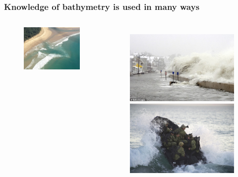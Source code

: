 \documentclass[7pt]{beamer}
\begin{document}
\begin{frame}
    \frametitle{Knowledge of bathymetry is used in many ways}
        \begin{columns}
                \begin{figure}[h!]
                		\includegraphics[width=1\linewidth]{img/Rip_C.jpg}\hfill
                \end{figure}              
                \begin{figure}
                		\includegraphics[width=1\linewidth]{img/C_Flood.jpg}\vfill
               		\includegraphics[width=1\linewidth]{img/Navy_S.jpg}

\end{figure}
\end{columns}
\end{frame}
\end{document}
